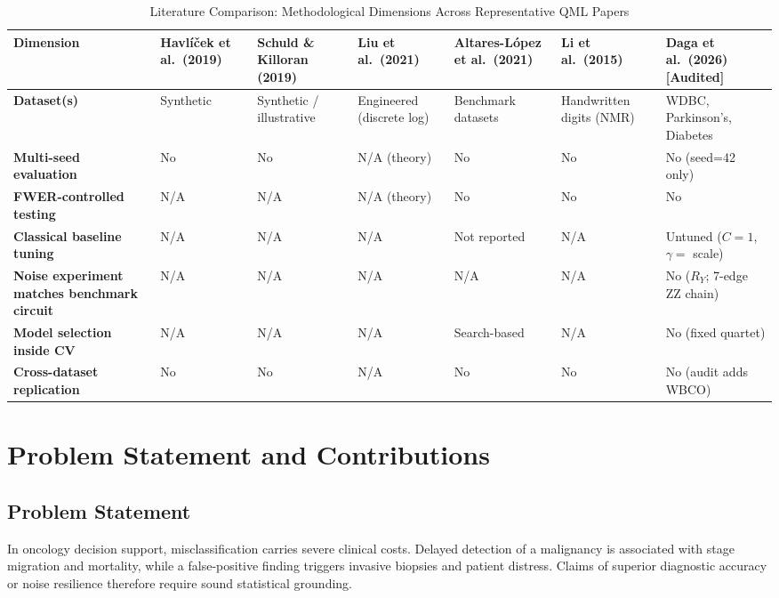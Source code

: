 \documentclass[journal,twocolumn]{IEEEtran}
\begin{document}
\begin{table}[!t]
\caption{Literature Comparison: Methodological Dimensions Across Representative QML Papers}
\label{tab:litcomp}
\centering
\footnotesize
\renewcommand{\arraystretch}{1.2}
\begin{tabularx}{\textwidth}{>{\raggedright\arraybackslash\bfseries}p{3.2cm} *{6}{>{\centering\arraybackslash}X}}
\toprule
Dimension & Havl{\'i}{\v c}ek et al.\ (2019) & Schuld \& Killoran (2019) & Liu et al.\ (2021) & Altares-L{\'o}pez et al.\ (2021) & Li et al.\ (2015) & Daga et al.\ (2026) [Audited] \\
\midrule
Dataset(s) & Synthetic & Synthetic / illustrative & Engineered (discrete log) & Benchmark datasets & Handwritten digits (NMR) & WDBC, Parkinson's, Diabetes \\
Multi-seed evaluation & No & No & N/A (theory) & No & No & No (seed=42 only) \\
FWER-controlled testing & N/A & N/A & N/A (theory) & No & No & No \\
Classical baseline tuning & N/A & N/A & N/A & Not reported & N/A & Untuned ($C=1$, $\gamma=$ scale) \\
Noise experiment matches benchmark circuit & N/A & N/A & N/A & N/A & N/A & No ($R_Y$; 7-edge ZZ chain) \\
Model selection inside CV & N/A & N/A & N/A & Search-based & N/A & No (fixed quartet) \\
Cross-dataset replication & No & No & N/A & No & No & No (audit adds WBCO) \\
\bottomrule
\end{tabularx}
\end{table}

\section{Problem Statement and Contributions}
\label{sec:problem}

\subsection{Problem Statement}

In oncology decision support, misclassification carries severe clinical costs. Delayed detection of a malignancy is associated with stage migration and mortality, while a false-positive finding triggers invasive biopsies and patient distress. Claims of superior diagnostic accuracy or noise resilience therefore require sound statistical grounding.
\end{document}
